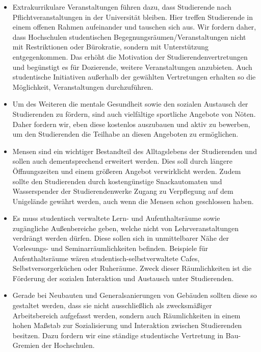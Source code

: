 \documentclass[DIV=calc]{scrartcl}
\begin{document}
\begin{itemize}
    \item Extrakurrikulare Veranstaltungen führen dazu, dass Studierende nach Pflichtveranstaltungen in der Universität bleiben. Hier treffen Studierende in einem offenen Rahmen aufeinander und tauschen sich aus. Wir fordern daher, dass Hochschulen studentischen Begegnungsräumen/Veranstaltungen nicht mit Restriktionen oder Bürokratie, sondern mit Unterstützung entgegenkommen. Das erhöht die Motivation der Studierendenvertretungen und begünstigt es für Dozierende, weitere Veranstaltungen anzubieten. Auch studentische Initiativen außerhalb der gewählten Vertretungen erhalten so die Möglichkeit, Veranstaltungen durchzuführen.

    \item Um des Weiteren die mentale Gesundheit sowie den sozialen Austausch der Studierenden zu fördern, sind auch vielfältige sportliche Angebote von Nöten. Daher fordern wir, eben diese kostenlos auszubauen und aktiv zu bewerben, um den Studierenden die Teilhabe an diesen Angeboten zu ermöglichen.

    \item Mensen sind ein wichtiger Bestandteil des Alltagslebens der Studierenden und sollen auch dementsprechend erweitert werden. Dies soll durch längere Öffnungszeiten und einem größeren Angebot verwirklicht werden. Zudem sollte den Studierenden durch kostengünstige Snackautomaten und Wasserspender der Studierendenwerke Zugang zu Verpflegung auf dem Unigelände gewährt werden, auch wenn die Mensen schon geschlossen haben.

    \item Es muss studentisch verwaltete Lern- und Aufenthaltsräume sowie zugängliche Außenbereiche geben, welche nicht von Lehrveranstaltungen verdrängt werden dürfen. Diese sollen sich in unmittelbarer Nähe der Vorlesungs- und Seminarräumlichkeiten befinden. Beispiele für Aufenthaltsräume wären studentisch-selbstverwaltete Cafes, Selbstversorgerküchen oder Ruheräume. Zweck dieser Räumlichkeiten ist die Förderung der sozialen Interaktion und Austausch unter Studierenden.

    \item Gerade bei Neubauten und Generalsanierungen von Gebäuden sollten diese so gestaltet werden, dass sie nicht ausschließlich als zwecksmäßiger Arbeitsbereich aufgefasst werden, sondern auch Räumlichkeiten in einem hohen Maßstab zur Sozialisierung und Interaktion zwischen Studierenden besitzen. Dazu fordern wir eine ständige studentische Vertretung in Bau-Gremien der Hochschulen.


\end{itemize}
\end{document}
